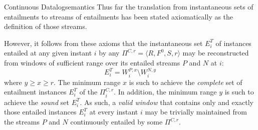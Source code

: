 \begin{nestedsection}{Continuous Datalog}{semantics}
Thus far the translation from instantaneous sets of entailments to
streams of entailments has been stated axiomatically as the definition
of those streams.

However, it follows from these axioms that the instantaneous set
$E^T_{i}$ of instances entailed at any given instant $i$ by any
$\Pi^{C,r} = \langle R, F^0, S, r \rangle$ may be reconstructed from
windows of sufficient range over its entailed streams $P$ and $N$ at
$i$:
\[ E^T_{i} = W^{P,x}_{i} \setminus W^{N,y}_{i} \]
where ${y \geq x \geq r}$. The minimum range $x$ is such to achieve
the \emph{complete} set of entailment instances $E^T_{i}$ of the
$\Pi^{C,r}_{i}$. In addition, the minimum range $y$ is such to achieve the
\emph{sound} set $E^T_{i}$. As such, a \emph{valid window} that
contains only and exactly those entailed instances $E^T_{i}$ at every
instant $i$ may be trivially maintained from the streams $P$ and $N$
continuously entailed by some $\Pi^{C,r}$.








\end{nestedsection}

